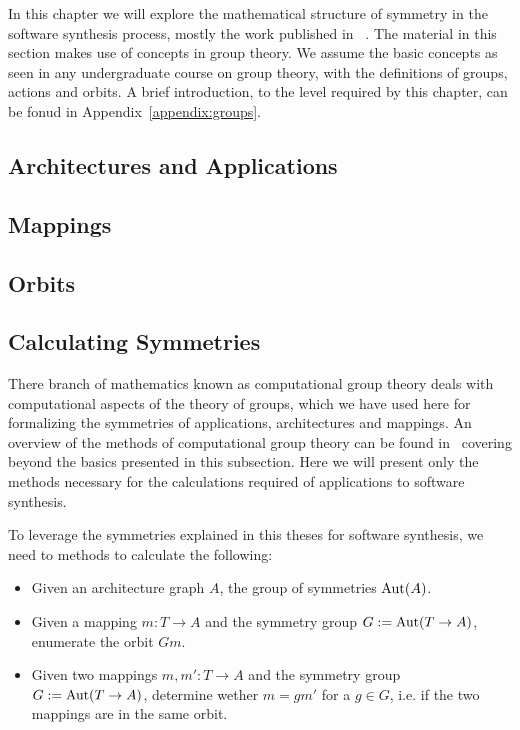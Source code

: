 In this chapter we will explore the mathematical structure of symmetry in the software synthesis process, mostly the work published in ~\cite{goens_iess15,goens_taco17,goens_scopes17}.
The material in this section makes use of concepts in group theory. We assume the basic concepts as seen in any undergraduate course on group theory, with the definitions of groups, actions and orbits. A brief introduction, to the level required by this chapter, can be fonud in Appendix~\ref{appendix:groups}. 


\subsection{Architectures and Applications}

\subsection{Mappings}

\subsection{Orbits} 

\subsection{Calculating Symmetries}
There branch of mathematics known as computational group theory deals with computational aspects of the theory of groups, which we have used here for formalizing the symmetries of applications, architectures and mappings. 
An overview of the methods of computational group theory can be found in~\cite{seress2003permutation} covering beyond the basics presented in this subsection.
Here we will present only the methods necessary for the calculations required of applications to software synthesis.

To leverage the symmetries explained in this theses for software synthesis, we need to methods to calculate the following:
\begin{itemize}
\item Given an architecture graph $A$, the group of symmetries $\operatorname{Aut}(A)$.
\item Given a mapping $m : T \rightarrow A$ and the symmetry group $G := \operatorname{Aut}(T \rightarrow A)$, enumerate the orbit $Gm$.
\item Given two mappings $m,m' : T \rightarrow A$ and the symmetry group $G := \operatorname{Aut}(T \rightarrow A)$, determine wether $m = gm'$ for a $g \in G$, i.e. if the two mappings are in the same orbit.
\end{itemize}


